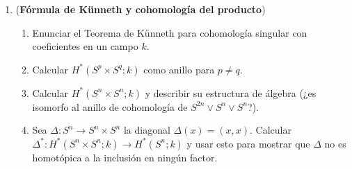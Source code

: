 \documentclass[11pt,a4paper]{article}
\theoremstyle{plain}
\theoremstyle{definition}
\theoremstyle{remark}
\newcommand{\RR}{\mathbb R}
\newcommand{\ZZ}{\mathbb Z}
\begin{document}
\begin{enumerate}[label=\arabic*.,leftmargin=*]
\noindent\textbf{Solución.}
\begin{enumerate}[label=\alph*)]
\item Es el Teorema~\ref{thm:mayer-vietoris-cohomologia}.
\item Tomamos $U=S^n\setminus\{N\}$, $V=S^n\setminus\{S\}$, ambos
contráctiles, y $U\cap V\simeq S^{n-1}$. Para $k<n-1$, la sucesión da
$H^k_{\mathrm{dR}}(S^n)\cong H^{k-1}_{\mathrm{dR}}(S^{n-1})$ (inducción).
Para $k=n$, el segmento
\[
0\to H^{n-1}_{\mathrm{dR}}(U\cap V)\xrightarrow{\delta^{-1}}H^n_{\mathrm{dR}}(S^n)\to H^n_{\mathrm{dR}}(U)\oplus H^n_{\mathrm{dR}}(V)=0
\]
da $H^n_{\mathrm{dR}}(S^n)\cong H^{n-1}_{\mathrm{dR}}(S^{n-1})\cong\cdots\cong H^1_{\mathrm{dR}}(S^1)\cong\RR$.
\item Por Künneth: $H^k(S^1\times S^n;\ZZ)\cong H^k(S^1;\ZZ)\oplus H^{k-1}(S^1;\ZZ)\otimes H^1(S^n;\ZZ)\oplus\cdots$.
Con el resultado de Künneth para cohomología, se obtiene $\ZZ$ en
$k=0,1,n,n+1$ y $0$ en otro caso.
\item Como $H^n(S^n;\ZZ)\cong\ZZ$, el homomorfismo $f^*$ es la
multiplicación por algún entero $d$. Por dualidad con la homología (vía el
coeficiente universal), $d$ coincide con $f_*$ en $H_n(S^n;\ZZ)$, que es
por definición $\deg(f)$.
\end{enumerate}

\item (\textbf{Fórmula de Künneth y cohomología del producto})
\begin{enumerate}[label=\alph*)]
\item Enunciar el Teorema de Künneth para cohomología singular con
coeficientes en un campo $k$.
\item Calcular $H^*(S^p\times S^q;k)$ como anillo para $p\ne q$.
\item Calcular $H^*(S^n\times S^n;k)$ y describir su estructura de álgebra
(¿es isomorfo al anillo de cohomología de $S^{2n}\vee S^n\vee S^n$?).
\item Sea $\Delta:S^n\to S^n\times S^n$ la diagonal $\Delta(x)=(x,x)$.
Calcular $\Delta^*:H^*(S^n\times S^n;k)\to H^*(S^n;k)$ y usar esto para
mostrar que $\Delta$ no es homotópica a la inclusión en ningún factor.
\end{enumerate}


\end{enumerate}
\end{document}
